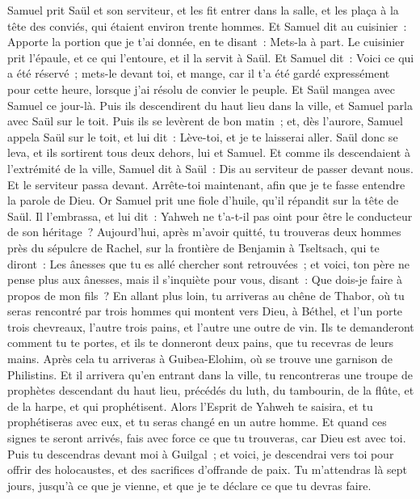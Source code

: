 \begin{multicols}{2}
Samuel prit Saül et son serviteur, et les fit entrer dans la salle, et les plaça à la tête des conviés, qui étaient environ trente hommes.
Et Samuel dit au cuisinier~: Apporte la portion que je t'ai donnée, en te disant~: Mets-la à part.
Le cuisinier prit l'épaule, et ce qui l'entoure, et il la servit à Saül. Et Samuel dit~: Voici ce qui a été réservé~; mets-le devant toi, et mange, car il t'a été gardé expressément pour cette heure, lorsque j'ai résolu de convier le peuple. Et Saül mangea avec Samuel ce jour-là.
Puis ils descendirent du haut lieu dans la ville, et Samuel parla avec Saül sur le toit.
Puis ils se levèrent de bon matin~; et, dès l'aurore, Samuel appela Saül sur le toit, et lui dit~: Lève-toi, et je te laisserai aller. Saül donc se leva, et ils sortirent tous deux dehors, lui et Samuel.
Et comme ils descendaient à l'extrémité de la ville, Samuel dit à Saül~: Dis au serviteur de passer devant nous. Et le serviteur passa devant. Arrête-toi maintenant, afin que je te fasse entendre la parole de Dieu.
\VerseOne{}Or Samuel prit une fiole d'huile, qu'il répandit sur la tête de Saül. Il l'embrassa, et lui dit~: Yahweh ne t'a-t-il pas oint pour être le conducteur de son héritage~?
Aujourd'hui, après m'avoir quitté, tu trouveras deux hommes près du sépulcre de Rachel, sur la frontière de Benjamin à Tseltsach, qui te diront~: Les ânesses que tu es allé chercher sont retrouvées~; et voici, ton père ne pense plus aux ânesses, mais il s'inquiète pour vous, disant~: Que dois-je faire à propos de mon fils~?
En allant plus loin, tu arriveras au chêne de Thabor, où tu seras rencontré par trois hommes qui montent vers Dieu, à Béthel, et l'un porte trois chevreaux, l'autre trois pains, et l'autre une outre de vin.
Ils te demanderont comment tu te portes, et ils te donneront deux pains, que tu recevras de leurs mains.
Après cela tu arriveras à Guibea-Elohim, où se trouve une garnison de Philistins. Et il arrivera qu'en entrant dans la ville, tu rencontreras une troupe de prophètes descendant du haut lieu, précédés du luth, du tambourin, de la flûte, et de la harpe, et qui prophétisent.
Alors l'Esprit de Yahweh te saisira, et tu prophétiseras avec eux, et tu seras changé en un autre homme.
Et quand ces signes te seront arrivés, fais avec force ce que tu trouveras, car Dieu est avec toi.
Puis tu descendras devant moi à Guilgal~; et voici, je descendrai vers toi pour offrir des holocaustes, et des sacrifices d'offrande de paix. Tu m'attendras là sept jours, jusqu'à ce que je vienne, et que je te déclare ce que tu devras faire.

\end{multicols}
